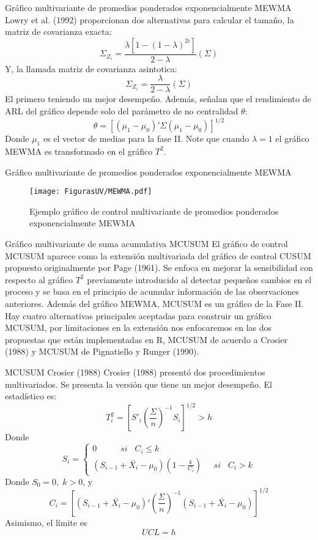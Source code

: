 \documentclass[10pt]{beamer}
\begin{document}
\begin{frame}{Gráfico multivariante de promedios ponderados exponencialmente MEWMA}
Lowry et al. (1992) proporcionan dos alternativas para calcular el tamaño, la matriz de covarianza exacta:
$$\Sigma_{Z_i}=\frac{\lambda\left[1-(1-\lambda)^{2i}\right]}{2-\lambda}(\Sigma)$$
Y, la llamada matriz de covarianza asintotica:
$$\Sigma_{Z_i}=\frac{\lambda}{2-\lambda}(\Sigma)$$
El primero teniendo un mejor desempeño.
Además, señalan que el rendimiento de ARL del gráfico depende solo del parámetro de no centralidad $\theta$:
$$\theta=\left[(\mu_1-\mu_0)'\Sigma (\mu_1-\mu_0)\right]^{1/2}$$
Donde $\mu_1$ es el vector de medias para la fase II. Note que cuando $\lambda=1$ el gráfico MEWMA es transformado en el gráfico $T^2$.
\end{frame}

\begin{frame}{Gráfico multivariante de promedios ponderados exponencialmente MEWMA}
\begin{figure}[h!]
  \centering
  \texttt{[image: FigurasUV/MEWMA.pdf]}
  \caption{Ejemplo gráfico de control multivariante de promedios ponderados exponencialmente MEWMA}
\end{figure}
\end{frame}

\begin{frame}{Gráfico multivariante de suma acumulativa MCUSUM}
El gráfico de control MCUSUM aparece como la extensión multivariada del gráfico de control CUSUM propuesto originalmente por Page (1961). Se enfoca en mejorar la sensibilidad con respecto al gráfico $T^2$ previamente introducido al detectar pequeños cambios en el proceso y se basa en el principio de acumular información de las observaciones anteriores. Además del gráfico MEWMA, MCUSUM es un gráfico de la Fase II. Hay cuatro alternativas principales aceptadas para construir un gráfico MCUSUM, por limitaciones en la extensión nos enfocaremos en las dos propuestas que están implementadas en R, MCUSUM de acuerdo a Crosier (1988) y MCUSUM de Pignatiello y Runger (1990).
\end{frame}

\begin{frame}{MCUSUM Crosier (1988)}
Crosier (1988) presentó dos procedimientos multivariados. Se presenta la versión que tiene un mejor desempeño. El estadístico es:
$$T_i^2=\left[S'_i\left(\frac{\Sigma}{n}\right)^{-1}S_i\right]^{1/2}>h$$
Donde 
\begin{equation*}
S_i=\left\{
\begin{aligned}
0 \;\;\;\;\;\;\;\;\;\; si \;\;\; C_i\leq k\\
(S_{i-1}+\bar{X_{i}}-\mu_0)(1-\frac{k}{C_i}) \;\;\;\;\; si \;\;\; C_i> k
\end{aligned}
\right.
\end{equation*}
Donde $S_0=0,\; k>0$, y
$$C_i=\left[(S_{i-1}+\bar{X_{i}}-\mu_0)'\left(\frac{\Sigma}{n}\right)^{-1}(S_{i-1}+\bar{X_{i}}-\mu_0)\right]^{1/2}$$
Asimismo, el límite es
$$UCL=h$$
\end{frame}
\end{document}
